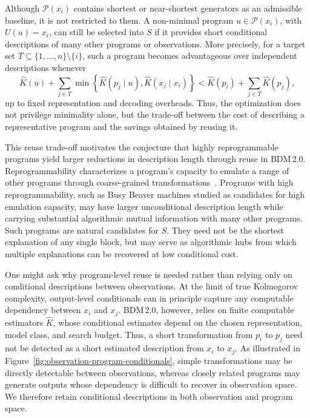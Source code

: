 \documentclass{article}
\begin{document}
Although \(\mathcal{P}(x_i)\) contains shortest or near-shortest generators as an admissible baseline, it is not restricted to them. A non-minimal program \(u\in\mathcal{P}(x_i)\), with \(U(u)=x_i\), can still be selected into \(S\) if it provides short conditional descriptions of many other programs or observations. More precisely, for a target set \(T\subseteq\{1,\ldots,n\}\setminus\{i\}\), such a program becomes advantageous over independent descriptions whenever
\[
\hat K(u)
+
\sum_{j\in T}
\min\left\{
\hat K(p_j\mid u),
\hat K(x_j\mid x_i)
\right\}
<
\hat K(p_i)
+
\sum_{j\in T}\hat K(p_j),
\]
up to fixed representation and decoding overheads. Thus, the optimization does not privilege minimality alone, but the trade-off between the cost of describing a representative program and the savings obtained by reusing it.

This reuse trade-off motivates the conjecture that highly reprogrammable programs yield larger reductions in description length through reuse in BDM\,2.0. Reprogrammability characterizes a program's capacity to emulate a range of other programs through coarse-grained transformations~\cite{zenil_asymptotic_2017}. Programs with high reprogrammability, such as Busy Beaver machines studied as candidates for high emulation capacity, may have larger unconditional description length while carrying substantial algorithmic mutual information with many other programs. Such programs are natural candidates for \(S\). They need not be the shortest explanation of any single block, but may serve as algorithmic hubs from which multiple explanations can be recovered at low conditional cost.

One might ask why program-level reuse is needed rather than relying only on conditional descriptions between observations. At the limit of true Kolmogorov complexity, output-level conditionals can in principle capture any computable dependency between \(x_i\) and \(x_j\). BDM\,2.0, however, relies on finite computable estimators \(\hat K\), whose conditional estimates depend on the chosen representation, model class, and search budget. Thus, a short transformation from \(p_i\) to \(p_j\) need not be detected as a short estimated description from \(x_i\) to \(x_j\). As illustrated in Figure~\ref{fig:observation-program-conditionals}, simple transformations may be directly detectable between observations, whereas closely related programs may generate outputs whose dependency is difficult to recover in observation space. We therefore retain conditional descriptions in both observation and program space.
\end{document}
